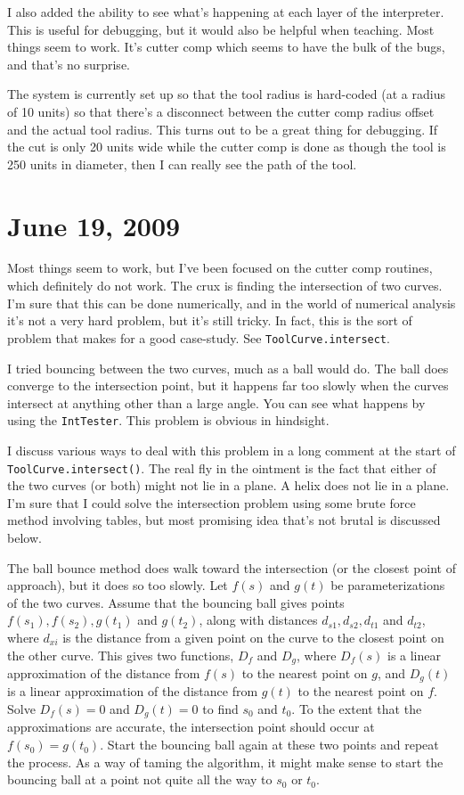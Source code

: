 \documentclass[titlepage,oneside,10pt]{article}
\begin{document}
I also added the ability to see what's happening at each layer of the
interpreter. This is useful for debugging, but it would also be
helpful when teaching. Most things seem to work. It's cutter comp
which seems to have the bulk of the bugs, and that's no surprise.

The system is currently set up so that the tool radius is hard-coded
(at a radius of 10 units) so that there's a disconnect between the
cutter comp radius offset and the actual tool radius. This turns out
to be a great thing for debugging. If the cut is only 20 units wide
while the cutter comp is done as though the tool is 250 units in
diameter, then I can really see the path of the tool.

\section{June 19, 2009}

Most things seem to work, but I've been focused on the cutter comp
routines, which definitely do not work. The crux is finding the
intersection of two curves. I'm sure that this can be done
numerically, and in the world of numerical analysis it's not a very
hard problem, but it's still tricky. In fact, this is the sort of
problem that makes for a good case-study. See 
{\tt ToolCurve.intersect{}}.

I tried bouncing between the two curves, much as a ball would do. The
ball does converge to the intersection point, but it happens far too
slowly when the curves intersect at anything other than a large
angle. You can see what happens by using the {\tt IntTester}. This
problem is obvious in hindsight. 

I discuss various ways to deal with this problem in a long comment at
the start of {\tt ToolCurve.intersect()}. The real fly in the ointment
is the fact that either of the two curves (or both) might not lie in a
plane. A helix does not lie in a plane. I'm sure that I could solve
the intersection problem using some brute force method involving
tables, but most promising idea that's not brutal is discussed
below.

The ball bounce method does walk toward the intersection (or the
closest point of approach), but it does so too slowly. Let $f(s)$ and
$g(t)$ be parameterizations of the two curves. Assume that the
bouncing ball gives points $f(s_1), f(s_2), g(t_1)$ and $g(t_2)$,
along with distances $d_{s1}, d_{s2}, d_{t1}$ and $d_{t2}$, where
$d_{xi}$ is the distance from a given point on the curve to the
closest point on the other curve. This gives two functions, $D_f$ and
$D_g$, where $D_f(s)$ is a linear approximation of the distance from
$f(s)$ to the nearest point on $g$, and $D_g(t)$ is a linear
approximation of the distance from $g(t)$ to the nearest point on
$f$. Solve $D_f(s)=0$ and $D_g(t)=0$ to find $s_0$ and $t_0$. To the
extent that the approximations are accurate, the intersection point
should occur at $f(s_0)=g(t_0)$. Start the bouncing ball again at
these two points and repeat the process. As a way of taming the
algorithm, it might make sense to start the bouncing ball at a point
not quite all the way to $s_0$ or $t_0$.
\end{document}
